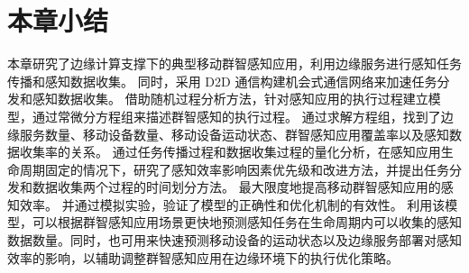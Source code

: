 \section{本章小结}

本章研究了边缘计算支撑下的典型移动群智感知应用，利用边缘服务进行感知任务传播和感知数据收集。
同时，采用 D2D 通信构建机会式通信网络来加速任务分发和感知数据收集。
借助随机过程分析方法，针对感知应用的执行过程建立模型，通过常微分方程组来描述群智感知的执行过程。
通过求解方程组，找到了边缘服务数量、移动设备数量、移动设备运动状态、群智感知应用覆盖率以及感知数据收集率的关系。
通过任务传播过程和数据收集过程的量化分析，在感知应用生命周期固定的情况下，研究了感知效率影响因素优先级和改进方法，并提出任务分发和数据收集两个过程的时间划分方法。
最大限度地提高移动群智感知应用的感知效率。
并通过模拟实验，验证了模型的正确性和优化机制的有效性。
利用该模型，可以根据群智感知应用场景更快地预测感知任务在生命周期内可以收集的感知数据数量。同时，也可用来快速预测移动设备的运动状态以及边缘服务部署对感知效率的影响，以辅助调整群智感知应用在边缘环境下的执行优化策略。
